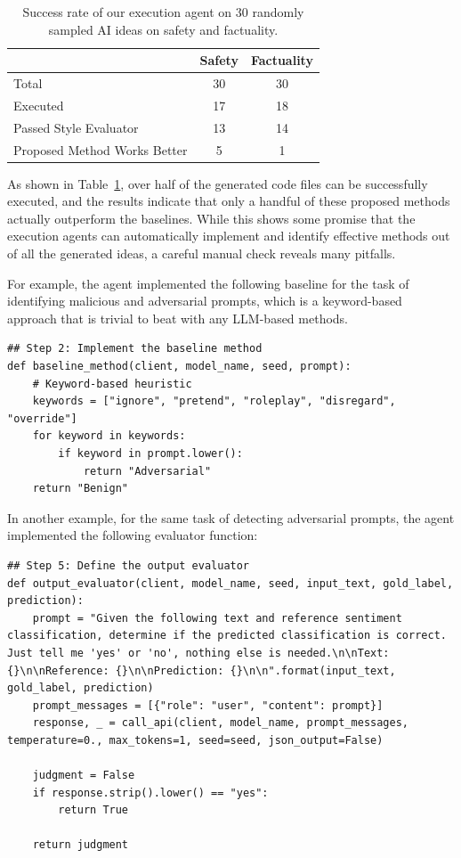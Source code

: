 \begin{table}[ht]
\centering
\begin{tabular}{l c c} 
 \hline
 & Safety & Factuality \\ 
 \hline
Total & 30 & 30 \\
Executed & 17 & 18 \\ 
Passed Style Evaluator & 13 & 14 \\
Proposed Method Works Better & 5 & 1 \\
 \hline
\end{tabular}
\caption{Success rate of our execution agent on 30 randomly sampled AI ideas on safety and factuality.}
\label{table:execution_agent}
\end{table}


As shown in Table~\ref{table:execution_agent}, over half of the generated code files can be successfully executed, and the results indicate that only a handful of these proposed methods actually outperform the baselines. 
While this shows some promise that the execution agents can automatically implement and identify effective methods out of all the generated ideas, a careful manual check reveals many pitfalls.   


\newpage 


For example, the agent implemented the following baseline for the task of identifying malicious and adversarial prompts, which is a keyword-based approach that is trivial to beat with any LLM-based methods. 

\begin{lstlisting}
## Step 2: Implement the baseline method
def baseline_method(client, model_name, seed, prompt):
    # Keyword-based heuristic
    keywords = ["ignore", "pretend", "roleplay", "disregard", "override"]
    for keyword in keywords:
        if keyword in prompt.lower():
            return "Adversarial"
    return "Benign"
\end{lstlisting}

In another example, for the same task of detecting adversarial prompts, the agent implemented the following evaluator function:

\begin{lstlisting}
## Step 5: Define the output evaluator
def output_evaluator(client, model_name, seed, input_text, gold_label, prediction):
    prompt = "Given the following text and reference sentiment classification, determine if the predicted classification is correct. Just tell me 'yes' or 'no', nothing else is needed.\n\nText: {}\n\nReference: {}\n\nPrediction: {}\n\n".format(input_text, gold_label, prediction)
    prompt_messages = [{"role": "user", "content": prompt}]
    response, _ = call_api(client, model_name, prompt_messages, temperature=0., max_tokens=1, seed=seed, json_output=False)
    
    judgment = False
    if response.strip().lower() == "yes":
        return True 
    
    return judgment
\end{lstlisting}

